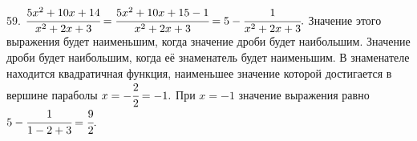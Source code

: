 59. $\cfrac{5x^2+10x+14}{x^2+2x+3}=\cfrac{5x^2+10x+15-1}{x^2+2x+3}=5-\cfrac{1}{x^2+2x+3}.$ Значение этого выражения будет наименьшим, когда значение дроби будет наибольшим. Значение дроби будет наибольшим, когда её знаменатель будет наименьшим. В знаменателе находится квадратичная функция, наименьшее значение которой достигается в вершине параболы $x=-\cfrac{2}{2}=-1.$ При $x=-1$ значение выражения равно $5-\cfrac{1}{1-2+3}=\cfrac{9}{2}.$\\
